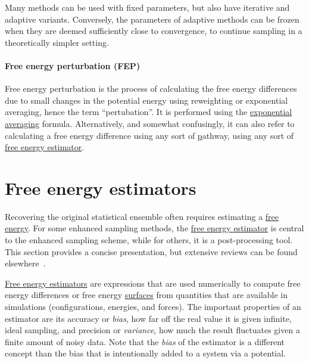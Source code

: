 \documentclass[9pt,review]{livecoms}
\begin{document}
Many methods can be used with fixed parameters, but also have iterative and adaptive variants. Conversely, the parameters of adaptive methods can be frozen when they are deemed sufficiently close to convergence, to continue sampling in a theoretically simpler setting.

\hypertarget{ref:FEP} {\paragraph{Free energy perturbation (FEP)}}
\label{FEP}

Free energy perturbation is the process of calculating the free energy differences due to small changes in the potential energy using reweighting or exponential averaging, hence the term ``pertubation''.  It is performed using the \hyperref[sec:fe_estimators:EXP]{exponential averaging} formula.  Alternatively, and somewhat confusingly, it can also refer to calculating a free energy difference using any sort of \hyperlink{ref:Alchemical} pathway, using any sort of \hyperlink{ref:FEestimator}{free energy estimator}. 


\section{Free energy estimators}
\label{sec:fe_estimators}

Recovering the original statistical ensemble often requires estimating a \hyperlink{ref:FE} {free energy}. For some enhanced sampling methods, the \hyperlink{ref:FEestimator} {free energy estimator} is central to the enhanced sampling scheme, while for others, it is a post-processing tool. This section provides a concise presentation, but extensive reviews can be found elsewhere~\cite{cchipot07:molsim, Lelievre2010, Paliwal_comparison_2011, shirts_comparison_2005, Klimovich_Shirts_Mobley_2015}.

\hyperlink{ref:FEestimator} {Free energy estimators} are expressions that are used numerically to compute free energy differences or free energy \hyperlink{ref:FES} {surfaces} from quantities that are available in simulations (configurations, energies, and forces).
The important properties of an estimator are its accuracy or  \textit{bias}, how far off the real value it is given infinite, ideal sampling, and precision or \textit{variance}, how much the result fluctuates given a finite amount of noisy data.  Note that the \textit{bias} of the estimator is a different concept than the bias that is intentionally added to a system via a potential. 
\end{document}
